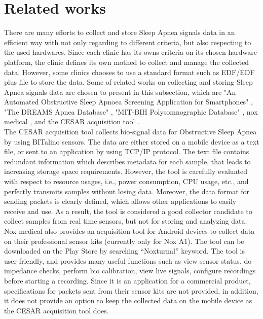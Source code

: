 \section{Related works}
There are many efforts to collect and store Sleep Apnea signals data in an efficient way with not only regarding to different criteria, but also respecting to the used hardwares. Since each clinic has its owns criteria on its chosen hardware platform, the clinic defines its own mothed to collect and manage the collected data. However, some clinics chooses to use a standard format such as EDF/EDF plus file to store the data. Some of related works on collecting and storing Sleep Apnea signals data are chosen to present in this subsection, which are "An Automated Obstructive Sleep Apnoea Screening Application for Smartphones" \citep{IEEESLEEPAP}, "The DREAMS Apnea Database" \citep{tcts}, "MIT-BIH Polysomnographic Database" \citep{MIT_BIH}, nox medical \citep{noxmedical}, and the CESAR acquisition tool \citep{SP} .\\
The CESAR acquisition tool collects bio-signal data for Obstructive Sleep Apnea by using BITalino sensors. The data are either stored on a mobile device as a text file, or sent to an application by using TCP/IP protocol. The text file contains redundant information which describes metadata for each sample, that leads to increasing storage space requirements. However, the tool is carefully evaluated with respect to resource usages, i.e., power consumption, CPU usage, etc., and perfectly transmits samples without losing data. Moreover, the data format for sending packets is clearly defined, which allows other applications to easily receive and use. As a result, the tool is considered a good collector candidate to collect samples from real time sensors, but not for storing and analyzing data.\\
Nox medical also provides an acquisition tool for Android devices to collect data on their professional sensor kits (currently only for Nox A1). The tool can be downloaded on the Play Store by searching “Noxturnal” keyword. The tool is user friendly, and provides many useful functions such as view sensor status, do impedance checks, perform bio calibration, view live signals, configure recordings before starting a recording. Since it is an application for a commercial product, specifications for packets sent from their sensor kits are not provided, in addition, it does not provide an option to keep the collected data on the mobile device as the CESAR acquisition tool does.\\
